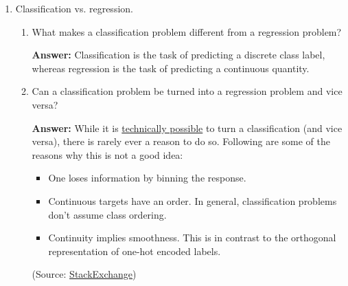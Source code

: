 \documentclass{article}
\newenvironment{QandA}{\begin{enumerate}[label=\arabic*.]}{\end{enumerate}}
\newenvironment{InnerQandA}{\begin{enumerate}[label=\roman*.]}{\end{enumerate}}
\newenvironment{answer}{\par\normalfont \textbf{Answer:}}{}
\begin{document}
\begin{QandA}
\begin{InnerQandA}
\begin{answer}
        

        (Source: \href{https://ekamperi.github.io/machine%20learning/2021/05/08/bayesian-optimization.html}{Stathis Kamperis's blog})
        \end{answer}
    \end{InnerQandA}

    \item Classification vs. regression.
    \begin{InnerQandA}
        \item What makes a classification problem different from a regression problem? 
        \begin{answer}
            Classification is the task of predicting a discrete class label, whereas regression is the task of predicting a continuous quantity.
        \end{answer}

        \item Can a classification problem be turned into a regression problem and vice versa?
        \begin{answer}
            While it is \href{https://machinelearningmastery.com/classification-versus-regression-in-machine-learning/}{technically possible} to turn a classification (and vice versa), there is rarely ever a reason to do so. Following are some of the reasons why this is not a good idea:
            \begin{itemize}
                \item One loses information by binning the response. 
                \item Continuous targets have an order. In general, classification problems don't assume class ordering.
                \item Continuity implies smoothness. This is in contrast to the orthogonal representation of one-hot encoded labels.
            \end{itemize}
            (Source: \href{https://stats.stackexchange.com/questions/565537/is-there-ever-a-reason-to-solve-a-regression-problem-as-a-classification-problem}{StackExchange})
        \end{answer}
    \end{InnerQandA}
    

\end{QandA}
\end{document}
